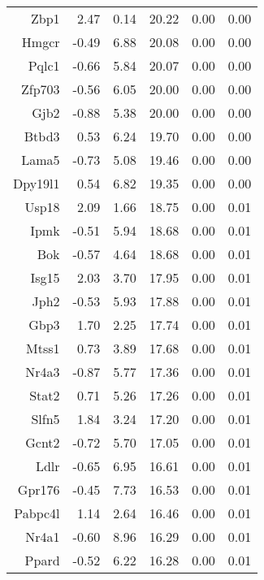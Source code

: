 \begin{table}[ht]
\begin{tabular}{rrrrrr}
  Zbp1 & 2.47 & 0.14 & 20.22 & 0.00 & 0.00 \\ 
  Hmgcr & -0.49 & 6.88 & 20.08 & 0.00 & 0.00 \\ 
  Pqlc1 & -0.66 & 5.84 & 20.07 & 0.00 & 0.00 \\ 
  Zfp703 & -0.56 & 6.05 & 20.00 & 0.00 & 0.00 \\ 
  Gjb2 & -0.88 & 5.38 & 20.00 & 0.00 & 0.00 \\ 
  Btbd3 & 0.53 & 6.24 & 19.70 & 0.00 & 0.00 \\ 
  Lama5 & -0.73 & 5.08 & 19.46 & 0.00 & 0.00 \\ 
  Dpy19l1 & 0.54 & 6.82 & 19.35 & 0.00 & 0.00 \\ 
  Usp18 & 2.09 & 1.66 & 18.75 & 0.00 & 0.01 \\ 
  Ipmk & -0.51 & 5.94 & 18.68 & 0.00 & 0.01 \\ 
  Bok & -0.57 & 4.64 & 18.68 & 0.00 & 0.01 \\ 
  Isg15 & 2.03 & 3.70 & 17.95 & 0.00 & 0.01 \\ 
  Jph2 & -0.53 & 5.93 & 17.88 & 0.00 & 0.01 \\ 
  Gbp3 & 1.70 & 2.25 & 17.74 & 0.00 & 0.01 \\ 
  Mtss1 & 0.73 & 3.89 & 17.68 & 0.00 & 0.01 \\ 
  Nr4a3 & -0.87 & 5.77 & 17.36 & 0.00 & 0.01 \\ 
  Stat2 & 0.71 & 5.26 & 17.26 & 0.00 & 0.01 \\ 
  Slfn5 & 1.84 & 3.24 & 17.20 & 0.00 & 0.01 \\ 
  Gcnt2 & -0.72 & 5.70 & 17.05 & 0.00 & 0.01 \\ 
  Ldlr & -0.65 & 6.95 & 16.61 & 0.00 & 0.01 \\ 
  Gpr176 & -0.45 & 7.73 & 16.53 & 0.00 & 0.01 \\ 
  Pabpc4l & 1.14 & 2.64 & 16.46 & 0.00 & 0.01 \\ 
  Nr4a1 & -0.60 & 8.96 & 16.29 & 0.00 & 0.01 \\ 
  Ppard & -0.52 & 6.22 & 16.28 & 0.00 & 0.01 \\ 
   \hline
\end{tabular}
\end{table}

